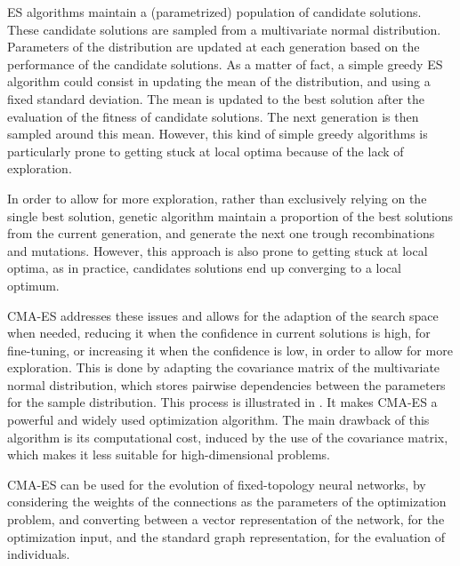 ES algorithms maintain a (parametrized) population of candidate solutions. These candidate solutions are sampled from a multivariate normal distribution. Parameters of the distribution
are updated at each generation based on the performance of the candidate solutions. As a matter of fact, a simple greedy ES algorithm could consist in updating the
mean of the distribution, and using a fixed standard deviation. The mean is updated to the best solution after the evaluation of the fitness of candidate
solutions. The next generation is then sampled around this mean. However, this kind of simple greedy algorithms is particularly prone to getting stuck at local optima because
of the lack of exploration.

In order to allow for more exploration, rather than exclusively relying on the single best solution, genetic algorithm maintain a proportion of the best solutions from
the current generation, and generate the next one trough recombinations and mutations. However, this approach is also prone to getting stuck at local optima, as in
practice, candidates solutions end up converging to a local optimum.

CMA-ES addresses these issues and allows for the adaption of the search space when needed, reducing it when the confidence in current solutions is high, for fine-tuning, or
increasing it when the confidence is low, in order to allow for more exploration. This is done by adapting the covariance matrix of the multivariate normal distribution,
which stores pairwise dependencies between the parameters for the sample distribution. This process is illustrated in .
It makes CMA-ES a powerful and widely used optimization algorithm. The main drawback of this algorithm is its computational cost, induced by the use of the covariance matrix,
which makes it less suitable for high-dimensional problems.

CMA-ES can be used for the evolution of fixed-topology neural networks, by considering the weights of the connections as the parameters of the optimization problem,
and converting between a vector representation of the network, for the optimization input, and the standard graph representation, for the evaluation of individuals.

